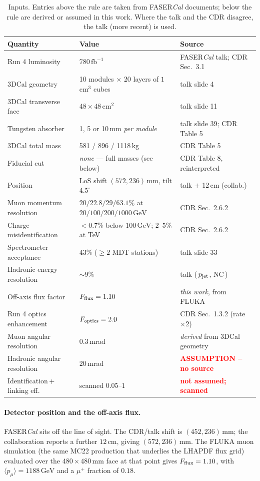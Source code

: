 \documentclass[11pt,a4paper]{article}
\newcommand{\GeV}{\,\mathrm{GeV}}
\newcommand{\fb}{\,\mathrm{fb}^{-1}}
\newcommand{\note}[1]{\textcolor{red}{\textbf{#1}}}
\begin{document}
\begin{table}[htbp]
\centering\small
\begin{tabular}{lll}
\toprule
Quantity & Value & Source \\
\midrule
Run 4 luminosity & $780\fb$ & FASER\emph{Cal} talk; CDR Sec.~3.1 \\
3DCal geometry & 10 modules $\times$ 20 layers of $1\,$cm$^3$ cubes & talk slide 4 \\
3DCal transverse face & $48\times48\,$cm$^2$ & talk slide 11 \\
Tungsten absorber & 1, 5 or 10\,mm \emph{per module} & talk slide 39; CDR Table 5 \\
3DCal total mass & 581 / 896 / 1118\,kg & CDR Table 5 \\
Fiducial cut & \emph{none} --- full masses (see below) & CDR Table 8, reinterpreted \\
Position & LoS shift $(572,236)\,$mm, tilt $4.5^\circ$ & talk $+$ 12\,cm (collab.) \\
Muon momentum resolution & $20/22.8/29/63.1\%$ at $20/100/200/1000\GeV$ & CDR Sec.~2.6.2 \\
Charge misidentification & $<0.7\%$ below $100\GeV$; $2$--$5\%$ at TeV & CDR Sec.~2.6.2 \\
Spectrometer acceptance & $43\%$ ($\geq2$ MDT stations) & talk slide 33 \\
Hadronic energy resolution & $\sim 9\%$ & talk (\,$p_{\rm jet}$, NC\,) \\
\midrule
Off-axis flux factor & $F_{\rm flux}=1.10$ & \emph{this work}, from FLUKA \\
Run 4 optics enhancement & $F_{\rm optics}=2.0$ & CDR Sec.~1.3.2 (rate $\times2$) \\
Muon angular resolution & $0.3\,$mrad & \emph{derived} from 3DCal geometry \\
Hadronic angular resolution & $20\,$mrad & \note{ASSUMPTION -- no source} \\
Identification\,+\,linking eff. & scanned $0.05$--$1$ & \note{not assumed; scanned} \\
\bottomrule
\end{tabular}
\caption{Inputs. Entries above the rule are taken from FASER\emph{Cal}
documents; below the rule are derived or assumed in this work. Where the talk
and the CDR disagree, the talk (more recent) is used.}
\label{tab:inputs}
\end{table}

\paragraph{Detector position and the off-axis flux.} FASER\emph{Cal} sits off
the line of sight. The CDR/talk shift is $(452,236)\,$mm; the collaboration
reports a further $12\,$cm, giving $(572,236)\,$mm. The FLUKA muon simulation
(the same MC22 production that underlies the LHAPDF flux grid) evaluated over the
$480\times480\,$mm face at that point gives $F_{\rm flux}=1.10$, with
$\langle p_\mu\rangle=1188\GeV$ and a $\mu^+$ fraction of $0.18$.
\end{document}
